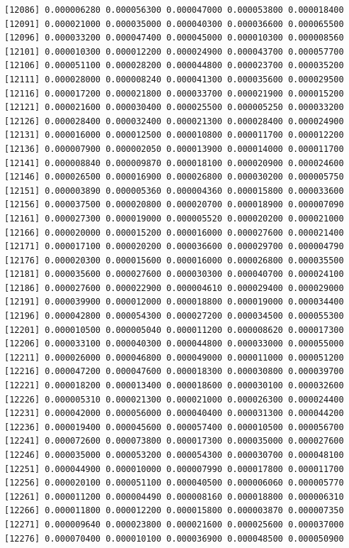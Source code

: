 \documentclass[]{article}
\begin{document}
\begin{verbatim}
[12086] 0.000006280 0.000056300 0.000047000 0.000053800 0.000018400
[12091] 0.000021000 0.000035000 0.000040300 0.000036600 0.000065500
[12096] 0.000033200 0.000047400 0.000045000 0.000010300 0.000008560
[12101] 0.000010300 0.000012200 0.000024900 0.000043700 0.000057700
[12106] 0.000051100 0.000028200 0.000044800 0.000023700 0.000035200
[12111] 0.000028000 0.000008240 0.000041300 0.000035600 0.000029500
[12116] 0.000017200 0.000021800 0.000033700 0.000021900 0.000015200
[12121] 0.000021600 0.000030400 0.000025500 0.000005250 0.000033200
[12126] 0.000028400 0.000032400 0.000021300 0.000028400 0.000024900
[12131] 0.000016000 0.000012500 0.000010800 0.000011700 0.000012200
[12136] 0.000007900 0.000002050 0.000013900 0.000014000 0.000011700
[12141] 0.000008840 0.000009870 0.000018100 0.000020900 0.000024600
[12146] 0.000026500 0.000016900 0.000026800 0.000030200 0.000005750
[12151] 0.000003890 0.000005360 0.000004360 0.000015800 0.000033600
[12156] 0.000037500 0.000020800 0.000020700 0.000018900 0.000007090
[12161] 0.000027300 0.000019000 0.000005520 0.000020200 0.000021000
[12166] 0.000020000 0.000015200 0.000016000 0.000027600 0.000021400
[12171] 0.000017100 0.000020200 0.000036600 0.000029700 0.000004790
[12176] 0.000020300 0.000015600 0.000016000 0.000026800 0.000035500
[12181] 0.000035600 0.000027600 0.000030300 0.000040700 0.000024100
[12186] 0.000027600 0.000022900 0.000004610 0.000029400 0.000029000
[12191] 0.000039900 0.000012000 0.000018800 0.000019000 0.000034400
[12196] 0.000042800 0.000054300 0.000027200 0.000034500 0.000055300
[12201] 0.000010500 0.000005040 0.000011200 0.000008620 0.000017300
[12206] 0.000033100 0.000040300 0.000044800 0.000033000 0.000055000
[12211] 0.000026000 0.000046800 0.000049000 0.000011000 0.000051200
[12216] 0.000047200 0.000047600 0.000018300 0.000030800 0.000039700
[12221] 0.000018200 0.000013400 0.000018600 0.000030100 0.000032600
[12226] 0.000005310 0.000021300 0.000021000 0.000026300 0.000024400
[12231] 0.000042000 0.000056000 0.000040400 0.000031300 0.000044200
[12236] 0.000019400 0.000045600 0.000057400 0.000010500 0.000056700
[12241] 0.000072600 0.000073800 0.000017300 0.000035000 0.000027600
[12246] 0.000035000 0.000053200 0.000054300 0.000030700 0.000048100
[12251] 0.000044900 0.000010000 0.000007990 0.000017800 0.000011700
[12256] 0.000020100 0.000051100 0.000040500 0.000006060 0.000005770
[12261] 0.000011200 0.000004490 0.000008160 0.000018800 0.000006310
[12266] 0.000011800 0.000012200 0.000015800 0.000003870 0.000007350
[12271] 0.000009640 0.000023800 0.000021600 0.000025600 0.000037000
[12276] 0.000070400 0.000010100 0.000036900 0.000048500 0.000050900

\end{verbatim}
\end{document}
